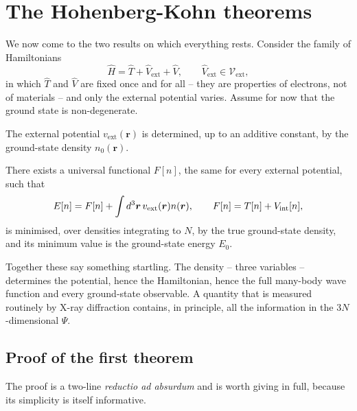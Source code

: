 \section{The Hohenberg-Kohn theorems}
\label{sec:hohenbergkohn}

We now come to the two results on which everything rests.  Consider the family
of Hamiltonians
\begin{equation}
  \hat{H} = \hat{T} + \hat{V}_{\mathrm{ext}} + \hat{V},
  \qquad
  \hat{V}_{\mathrm{ext}}\in\mathcal{V}_{\mathrm{ext}},
  \label{eq:8-family}
\end{equation}
in which $\hat{T}$ and $\hat{V}$ are fixed once and for all -- they are
properties of electrons, not of materials -- and only the external potential
varies.  Assume for now that the ground state is non-degenerate.

\begin{theorem}
The external potential $v_{\mathrm{ext}}(\bm{r})$ is determined, up to an
additive constant, by the ground-state density $n_0(\bm{r})$.
\end{theorem}

\begin{theorem}
There exists a universal functional $F[n]$, the same for every external
potential, such that
\begin{equation}
  E[n] = F[n] + \int d^3\bm{r}\,v_{\mathrm{ext}}(\bm{r})n(\bm{r}),
  \qquad
  F[n] = T[n] + V_{\mathrm{int}}[n],
  \label{eq:8-hkfunctional}
\end{equation}
is minimised, over densities integrating to $N$, by the true ground-state
density, and its minimum value is the ground-state energy $E_0$.
\end{theorem}

Together these say something startling.  The density -- three variables --
determines the potential, hence the Hamiltonian, hence the full many-body
wave function and every ground-state observable.  A quantity that is measured
routinely by X-ray diffraction contains, in principle, all the information in
the $3N$-dimensional $\Psi$.

\subsection{Proof of the first theorem}
\label{sec:hkproof}

The proof is a two-line \emph{reductio ad absurdum} and is worth giving in
full, because its simplicity is itself informative.


